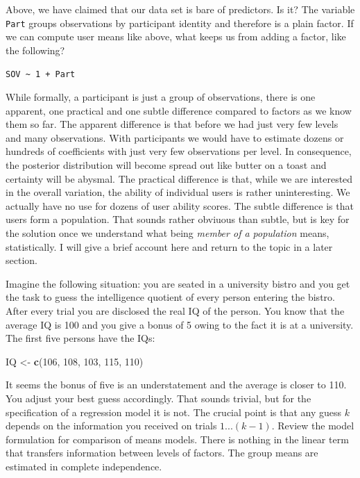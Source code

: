 \documentclass[]{svmono}
\newenvironment{Shaded}{\begin{snugshade}}{\end{snugshade}}
\newcommand{\KeywordTok}[1]{\textcolor[rgb]{0.13,0.29,0.53}{\textbf{#1}}}
\newcommand{\DecValTok}[1]{\textcolor[rgb]{0.00,0.00,0.81}{#1}}
\newcommand{\StringTok}[1]{\textcolor[rgb]{0.31,0.60,0.02}{#1}}
\newcommand{\NormalTok}[1]{#1}
\begin{document}
Above, we have claimed that our data set is bare of predictors. Is it?
The variable \texttt{Part} groups observations by participant identity
and therefore is a plain factor. If we can compute user means like
above, what keeps us from adding a factor, like the following?

\texttt{SOV\ \textasciitilde{}\ 1\ +\ Part}

While formally, a participant is just a group of observations, there is
one apparent, one practical and one subtle difference compared to
factors as we know them so far. The apparent difference is that before
we had just very few levels and many observations. With participants we
would have to estimate dozens or hundreds of coefficients with just very
few observations per level. In consequence, the posterior distribution
will become spread out like butter on a toast and certainty will be
abysmal. The practical difference is that, while we are interested in
the overall variation, the ability of individual users is rather
uninteresting. We actually have no use for dozens of user ability
scores. The subtle difference is that users form a population. That
sounds rather obviuous than subtle, but is key for the solution once we
understand what being \emph{member of a population} means,
statistically. I will give a brief account here and return to the topic
in a later section.

Imagine the following situation: you are seated in a university bistro
and you get the task to guess the intelligence quotient of every person
entering the bistro. After every trial you are disclosed the real IQ of
the person. You know that the average IQ is 100 and you give a bonus of
5 owing to the fact it is at a university. The first five persons have
the IQs:

\begin{Shaded}
\begin{Highlighting}[]
\NormalTok{IQ <-}\StringTok{ }\KeywordTok{c}\NormalTok{(}\DecValTok{106}\NormalTok{, }\DecValTok{108}\NormalTok{, }\DecValTok{103}\NormalTok{, }\DecValTok{115}\NormalTok{, }\DecValTok{110}\NormalTok{)}
\end{Highlighting}
\end{Shaded}

It seems the bonus of five is an understatement and the average is
closer to 110. You adjust your best guess accordingly. That sounds
trivial, but for the specification of a regression model it is not. The
crucial point is that any guess \(k\) depends on the information you
received on trials \(1...(k-1)\). Review the model formulation for
comparison of means models. There is nothing in the linear term that
transfers information between levels of factors. The group means are
estimated in complete independence.
\end{document}
